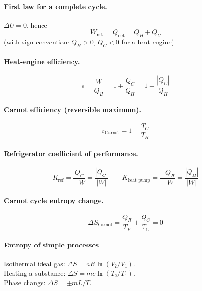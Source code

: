 \documentclass[11pt]{article}
\begin{document}
\paragraph{First law for a complete cycle.} $\Delta U = 0$, hence
\[
W_{\text{net}} = Q_{\text{net}} = Q_{H} + Q_{C}
\]
(with sign convention: $Q_{H} > 0$, $Q_{C} < 0$ for a heat engine).

\paragraph{Heat-engine efficiency.}
\[
e = \frac{W}{Q_{H}} = 1 + \frac{Q_{C}}{Q_{H}} = 1 - \frac{|Q_{C}|}{Q_{H}}
\]

\paragraph{Carnot efficiency (reversible maximum).}
\[
e_{\text{Carnot}} = 1 - \frac{T_{C}}{T_{H}}
\]

\paragraph{Refrigerator coefficient of performance.}
\[
K_{\text{ref}} = \frac{Q_{C}}{-W} = \frac{|Q_{C}|}{|W|}
\qquad
K_{\text{heat pump}} = \frac{-Q_{H}}{-W} = \frac{|Q_{H}|}{|W|}
\]

\paragraph{Carnot cycle entropy change.}
\[
\Delta S_{\text{Carnot}} = \frac{Q_{H}}{T_{H}} + \frac{Q_{C}}{T_{C}} = 0
\]

\paragraph{Entropy of simple processes.}
Isothermal ideal gas: $\Delta S = n R\ln(V_{2}/V_{1})$.\\
Heating a substance: $\Delta S = m c\ln(T_{2}/T_{1})$.\\
Phase change: $\Delta S = \pm m L / T$.
\end{document}
